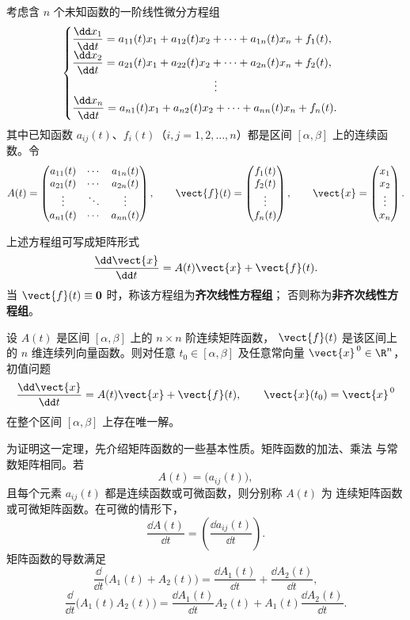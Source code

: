 考虑含 $n$ 个未知函数的一阶线性微分方程组
\[
	\begin{cases}
		\dfrac{\dd x_1}{\dd t}
		=a_{11}(t)x_1+a_{12}(t)x_2+\cdots+a_{1n}(t)x_n+f_1(t),\\
		\dfrac{\dd x_2}{\dd t}
		=a_{21}(t)x_1+a_{22}(t)x_2+\cdots+a_{2n}(t)x_n+f_2(t),\\
		\hspace{4.5cm}\vdots\\
		\dfrac{\dd x_n}{\dd t}
		=a_{n1}(t)x_1+a_{n2}(t)x_2+\cdots+a_{nn}(t)x_n+f_n(t).
	\end{cases}
\]
其中已知函数 $a_{ij}(t)$、$f_i(t)$（$i,j=1,2,\ldots,n$）都是区间
$[\alpha,\beta]$ 上的连续函数。令
\[
	A(t)=
	\begin{pmatrix}
		a_{11}(t) & \cdots & a_{1n}(t)\\
		a_{21}(t) & \cdots & a_{2n}(t)\\
		\vdots    & \ddots & \vdots\\
		a_{n1}(t) & \cdots & a_{nn}(t)
	\end{pmatrix},
	\qquad
	\vect{f}(t)=
	\begin{pmatrix}
		f_1(t)\\
		f_2(t)\\
		\vdots\\
		f_n(t)
	\end{pmatrix},
	\qquad
	\vect{x}=
	\begin{pmatrix}
		x_1\\
		x_2\\
		\vdots\\
		x_n
	\end{pmatrix}.
\]
\begin{definition}\label{def:齐次与非齐次线性方程组}
	上述方程组可写成矩阵形式
\[
	\dfrac{\dd \vect{x}}{\dd t}
	=A(t)\vect{x}+\vect{f}(t).
\]
当 $\vect{f}(t)\equiv\boldsymbol{0}$ 时，称该方程组为\textbf{齐次线性方程组}；
否则称为\textbf{非齐次线性方程组}。

\end{definition}
\begin{theorem}\label{thm:线性方程组的存在唯一性}
	设 $A(t)$ 是区间 $[\alpha,\beta]$ 上的 $n\times n$ 阶连续矩阵函数，
	$\vect{f}(t)$ 是该区间上的 $n$ 维连续列向量函数。则对任意
	$t_0\in[\alpha,\beta]$ 及任意常向量 $\vect{x}^{\,0}\in\R^n$，
	初值问题
	\[
		\dfrac{\dd \vect{x}}{\dd t}
		=A(t)\vect{x}+\vect{f}(t),
		\qquad
		\vect{x}(t_0)=\vect{x}^{\,0}
	\]
	在整个区间 $[\alpha,\beta]$ 上存在唯一解。
\end{theorem}

为证明这一定理，先介绍矩阵函数的一些基本性质。矩阵函数的加法、乘法
与常数矩阵相同。若
\[
	A(t)=\bigl(a_{ij}(t)\bigr),
\]
且每个元素 $a_{ij}(t)$ 都是连续函数或可微函数，则分别称 $A(t)$ 为
连续矩阵函数或可微矩阵函数。在可微的情形下，
\[
	\dfrac{\dd A(t)}{\dd t}
	=\left(\dfrac{\dd a_{ij}(t)}{\dd t}\right).
\]
矩阵函数的导数满足
\[
	\dfrac{\dd}{\dd t}\bigl(A_1(t)+A_2(t)\bigr)
	=\dfrac{\dd A_1(t)}{\dd t}
	+\dfrac{\dd A_2(t)}{\dd t},
\]
\[
	\dfrac{\dd}{\dd t}\bigl(A_1(t)A_2(t)\bigr)
	=\dfrac{\dd A_1(t)}{\dd t}A_2(t)
	+A_1(t)\dfrac{\dd A_2(t)}{\dd t}.
\]

